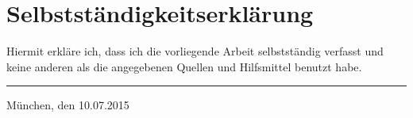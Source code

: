 \documentclass[a4paper,12pt]{article}
\begin{document}
\newpage

\printbibliography

\newpage

\section*{Selbstst\"andigkeitserkl\"arung}

Hiermit erkl\"are ich, dass ich die vorliegende Arbeit selbstst\"andig verfasst und keine anderen als die angegebenen Quellen und Hilfsmittel benutzt habe.

\vspace{30mm}

\hrule
\vspace{5mm}
M\"unchen, den 10.07.2015
\end{document}
